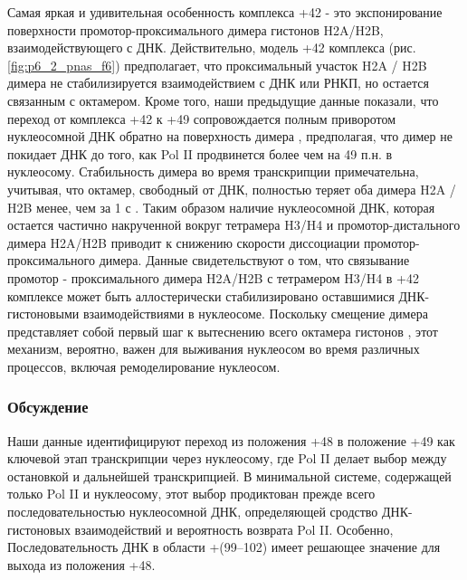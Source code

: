     Самая яркая и удивительная особенность комплекса +42 - это экспонирование поверхности промотор-проксимального димера гистонов H2A/H2B, взаимодействующего с ДНК. Действительно, модель +42 комплекса (рис. \ref{fig:p6_2_pnas_f6}) предполагает, что проксимальный участок H2A / H2B димера не стабилизируется взаимодействием с ДНК или РНКП, но остается связанным с октамером. Кроме того, наши предыдущие данные показали, что переход от комплекса +42 к +49 сопровождается полным приворотом нуклеосомной ДНК обратно на поверхность димера \cite{kulaeva_mechanism_2009}, предполагая, что димер не покидает ДНК до того, как Pol II продвинется более чем на 49 п.н. в нуклеосому. Стабильность димера во время транскрипции примечательна, учитывая, что октамер, свободный от ДНК, полностью теряет оба димера H2A / H2B менее, чем за 1 с \cite{feng_lifetime_1993}. Таким образом наличие нуклеосомной ДНК, которая остается частично накрученной вокруг тетрамера H3/H4 и промотор-дистального димера H2A/H2B приводит к снижению скорости диссоциации промотор-проксимального димера. Данные свидетельствуют о том, что связывание промотор - проксимального димера H2A/H2B с тетрамером H3/H4 в +42 комплексе может быть аллостерически стабилизировано оставшимися ДНК-гистоновыми взаимодействиями в нуклеосоме. Поскольку смещение димера представляет собой первый шаг к вытеснению всего октамера гистонов \cite{bintu_elongation_2011}, этот механизм, вероятно, важен для выживания нуклеосом во время различных процессов, включая ремоделирование нуклеосом.
    
    
    
   
    
\subsubsection{Обсуждение}
    
    Наши данные идентифицируют переход из положения +48 в положение +49 как ключевой этап транскрипции через нуклеосому, где Pol II делает выбор между остановкой и дальнейшей транскрипцией. В минимальной системе, содержащей только Pol II и нуклеосому, этот выбор продиктован прежде всего последовательностью нуклеосомной ДНК, определяющей сродство ДНК-гистоновых взаимодействий и вероятность возврата Pol II. Особенно, Последовательность ДНК в области +(99–102) имеет решающее значение для выхода из положения +48.
    
